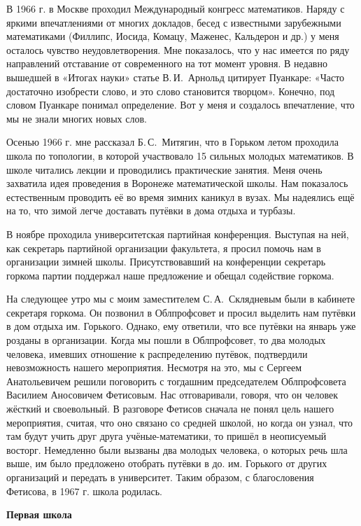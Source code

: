 В 1966 г. в Москве проходил Международный конгресс математиков. Наряду с яркими впечатлениями от многих докладов, бесед с известными зарубежными математиками (Филлипс, Иосида, Комацу, Маженес, Кальдерон и др.) у меня осталось чувство неудовлетворения. Мне показалось, что у нас имеется по ряду направлений отставание от современного на тот момент уровня. В недавно вышедшей в «Итогах науки» статье В.\,И.~Арнольд цитирует Пуанкаре: «Часто достаточно изобрести слово, и это слово становится творцом». Конечно, под словом Пуанкаре понимал определение. Вот у меня и создалось впечатление, что мы не знали многих новых слов.

Осенью 1966 г. мне рассказал Б.\,С.~Митягин, что в Горьком летом проходила школа по топологии, в которой участвовало 15 сильных молодых математиков. В школе читались лекции и проводились практические занятия. Меня очень захватила идея проведения в Воронеже математической школы.
Нам показалось естественным проводить её во время зимних каникул в вузах. Мы надеялись ещё на то, что зимой легче доставать путёвки в дома отдыха и турбазы.

В ноябре проходила университетская партийная конференция. Выступая на ней, как секретарь партийной организации факультета, я просил помочь нам в организации зимней школы. Присутствовавший на конференции секретарь горкома партии поддержал наше предложение и обещал содействие горкома.

На следующее утро мы с моим заместителем С.\,А.~Скля\-дневым были в кабинете секретаря горкома.
Он позвонил в Облпрофсовет и просил выделить нам путёвки в дом отдыха им. Горького.
Однако, ему ответили, что все путёвки на январь уже розданы в организации. Когда мы пошли в Облпрофсовет, то два молодых человека, имевших отношение к распределению путёвок, подтвердили невозможность нашего мероприятия. Несмотря на это, мы с Сергеем Анатольевичем решили поговорить с тогдашним председателем Облпрофсовета Василием Аносовичем Фетисовым. Нас отговаривали, говоря, что он человек жёсткий и своевольный. В разговоре Фетисов сначала не понял цель нашего мероприятия, считая, что оно связано со средней школой, но когда он
узнал, что там будут учить друг друга учёные-математики, то пришёл в неописуемый восторг. Немедленно были вызваны два молодых человека, о которых речь шла выше, им было предложено отобрать путёвки в до. им. Горького от других организаций и передать в университет. Таким образом, с благословения Фетисова, в 1967 г. школа родилась.

{\bf Первая школа}

